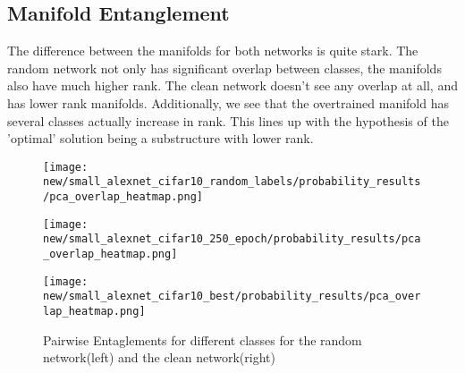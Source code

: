 \documentclass{article}
\begin{document}
        \subsection{Manifold Entanglement}
            The difference between the manifolds for both networks is quite stark. The random network not only has significant overlap between classes, the manifolds also have much higher rank. The clean network doesn't see any overlap at all, and has lower rank manifolds. Additionally, we see that the overtrained manifold has several classes actually increase in rank. This lines up with the hypothesis of the 'optimal' solution being a substructure with lower rank. 
            \begin{figure}[H]
                \centering
                
                \begin{minipage}{0.45\textwidth}
                    \centering
                    \texttt{[image: new/small\_alexnet\_cifar10\_random\_labels/probability\_results/pca\_overlap\_heatmap.png]}
                    
                \end{minipage}\hfill
                
                \begin{minipage}{0.45\textwidth}
                    \centering
                    \texttt{[image: new/small\_alexnet\_cifar10\_250\_epoch/probability\_results/pca\_overlap\_heatmap.png]}
                    
                \end{minipage}\hfill
                \begin{minipage}{0.45\textwidth}
                    \centering
                    \texttt{[image: new/small\_alexnet\_cifar10\_best/probability\_results/pca\_overlap\_heatmap.png]}
                \end{minipage}
            
                \caption{Pairwise Entaglements for different classes for the random network(left) and the clean network(right)}
                \label{fig:manifold_entanglement_small_alexnet}
            \end{figure}
        
\end{document}
